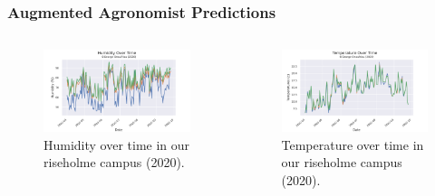 \documentclass[aspectratio=169]{beamer}
\begin{document}
  \begin{frame}
    \frametitle{Augmented Agronomist Predictions}
    \begin{columns}
      \begin{column}{0.5\textwidth}
        \begin{figure}[th!]
          \centering
          \includegraphics[origin=c,width=1\textwidth]{humidiy_over_time.png}
          \caption{Humidity over time in our riseholme campus (2020).}
          \label{fig:humidity}
        \end{figure}
      \end{column}
      \begin{column}{0.5\textwidth}
        \begin{figure}[th!]
          \centering
          \includegraphics[origin=c,width=1\textwidth]{temp_over_time.png}
          \caption{Temperature over time in our riseholme campus (2020).}
          \label{fig:temp}
        \end{figure}
      \end{column}
    \end{columns}
  \end{frame}
\end{document}
